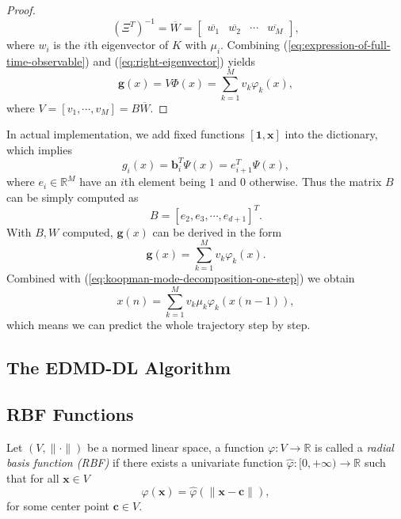 \documentclass[en, bibend=bibtex]{elegantpaper}
\theoremstyle{plain}
\begin{document}
\begin{proof}
  \begin{equation}
    \label{eq:right-eigenvector}
    (\Xi^T)^{-1} = \overline{W}
    = \left[
      \begin{array}{cccc}
        \overline{w_1}&\overline{w_2}&\cdots&\overline{w_M}
      \end{array}
    \right],
  \end{equation}
  where $w_i$ is the $i$th eigenvector of $K$ with $\mu_i$.
  Combining (\ref{eq:expression-of-full-time-observable})
  and (\ref{eq:right-eigenvector})
  yields
  \begin{equation}
    \label{eq:expression-of-g}
    \mathbf{g}(x) = V \Phi(x) = \sum\limits_{k = 1}^M v_k \varphi_k(x),
  \end{equation}
  where $V = [v_1,\cdots,v_M] = B\overline{W} $.
\end{proof}

In actual implementation,
we add fixed functions
$[\mathbf{1}, \mathbf{x}]$ into the dictionary,
which implies
\begin{equation*}
g_i(x) = \mathbf{b}_i^T \Psi(x) = e_{i+1}^T \Psi(x),
\end{equation*}
where $e_i \in \mathbb{R}^M$ have an $i$th element being $1$
and $0$ otherwise.
Thus the matrix $B$ can be simply computed as
\begin{equation*}
  B = [e_2, e_3, \cdots, e_{d+1}]^T.
\end{equation*}
With $B, W$ computed, $\mathbf{g}(x)$ can be derived in the form
\begin{equation*}
  \mathbf{g}(x) = \sum\limits_{k = 1}^M v_k\varphi_k(x).
\end{equation*}
Combined with (\ref{eq:koopman-mode-decomposition-one-step}) we obtain
\begin{equation*}
  x(n) = \sum\limits_{k = 1}^M v_k \mu_k \varphi_k(x(n-1)),
\end{equation*}
which means we can predict the whole trajectory step by step.

\subsection{The EDMD-DL Algorithm}

\subsection{RBF Functions}

\begin{definition}
  Let $(V, \|\cdot\|)$ be a normed linear space,
  a function $\varphi: V \rightarrow \mathbb{R}$ is called
  a \emph{radial basis function (RBF)} if
  there exists a univariate function $\hat{\varphi}: [0, +\infty) \rightarrow \mathbb{R}$
  such that for all $\mathbf{x} \in V$
  \begin{equation*}
   \varphi(\mathbf{x}) = \hat{\varphi}(\|\mathbf{x} - \mathbf{c}\|),
  \end{equation*}
  for some center point $\mathbf{c} \in V$.
\end{definition}
\end{document}
